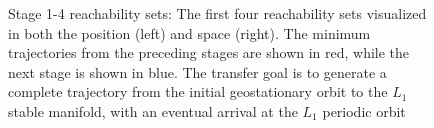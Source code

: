 \begin{figure}[htbp]

    \caption{Stage 1-4 reachability sets: The first four reachability sets visualized in both the position (left) and \Poincare space (right).
        The minimum trajectories from the preceding stages are shown in red, while the next stage is shown in blue.
    The transfer goal is to generate a complete trajectory from the initial geostationary orbit to the \( L_1 \) stable manifold, with an eventual arrival at the \( L_1 \) periodic orbit~\label{fig:stage1to4_reachability}}
\end{figure}
